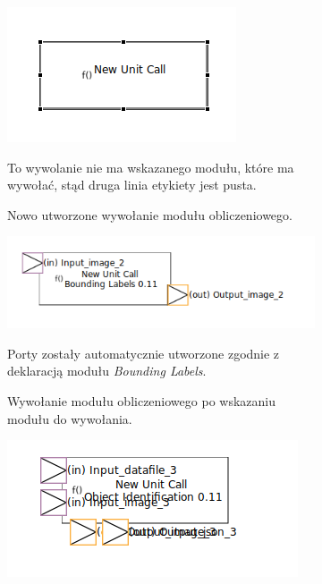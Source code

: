 \begin{figure}
	\centering
	\begin{subfigure}{.3\textwidth}
		\centering
		\includegraphics[width=.99\linewidth]{./images/sirius-desktop-empty-unit-call.png}
		\caption{Nowo utworzone wywołanie modułu obliczeniowego.}\label{ref:sirius-desktop-empty-unit-call}
    \medskip
    {\small To wywolanie nie ma wskazanego modułu, które ma wywołać, stąd
      druga linia etykiety jest pusta.}
    \vspace{50pt}
	\end{subfigure}
	\begin{subfigure}{.3\textwidth}
		\centering
		\includegraphics[width=.99\linewidth]{./images/sirius-desktop-change-unit-to-call-before.png}
		\caption{Wywołanie modułu obliczeniowego po wskazaniu modułu do wywołania.}\label{
      rys:sirius-desktop-change-unit-to-call-before}
    \medskip
    {\small Porty zostały automatycznie utworzone zgodnie z deklaracją modułu
      \emph{Bounding Labels}.}
    \medskip
	\end{subfigure}
	\begin{subfigure}{.3\textwidth}
		\centering
		\includegraphics[width=.99\linewidth]{./images/sirius-desktop-change-unit-to-call-after.png}

\end{subfigure}
\end{figure}
